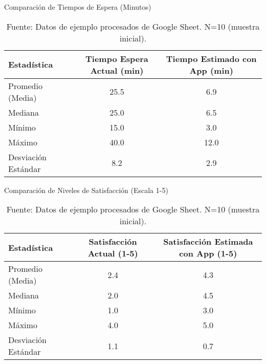 \documentclass[11pt, a4paper]{article}
\begin{document}
\begin{table}[H] %
    \centering
    \caption{Comparación de Tiempos de Espera (Minutos)}
    \label{tab:tiempos}
    \begin{tabular}{lcc}
        \toprule
        Estadística          & Tiempo Espera Actual (min) & Tiempo Estimado con App (min) \\
        \midrule
        Promedio (Media)     & 25.5                       & 6.9                           \\
        Mediana              & 25.0                       & 6.5                           \\
        Mínimo               & 15.0                       & 3.0                           \\
        Máximo               & 40.0                       & 12.0                          \\
        Desviación Estándar & 8.2                        & 2.9                           \\
        \bottomrule
    \end{tabular}
    \vspace{0.2cm} %
    \caption*{Fuente: Datos de ejemplo procesados de Google Sheet. N=10 (muestra inicial).}
\end{table}

\begin{table}[H] %
    \centering
    \caption{Comparación de Niveles de Satisfacción (Escala 1-5)}
    \label{tab:satisfaccion}
    \begin{tabular}{lcc}
        \toprule
        Estadística          & Satisfacción Actual (1-5) & Satisfacción Estimada con App (1-5) \\
        \midrule
        Promedio (Media)     & 2.4                       & 4.3                                 \\
        Mediana              & 2.0                       & 4.5                                 \\
        Mínimo               & 1.0                       & 3.0                                 \\
        Máximo               & 4.0                       & 5.0                                 \\
        Desviación Estándar & 1.1                       & 0.7                                 \\
        \bottomrule
    \end{tabular}
    \vspace{0.2cm} %
     \caption*{Fuente: Datos de ejemplo procesados de Google Sheet. N=10 (muestra inicial).}
\end{table}
\end{document}
